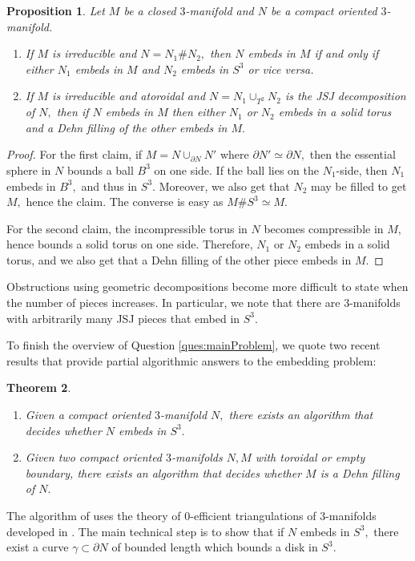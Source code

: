 \documentclass[12pt]{amsart}
\newtheorem{thm}{Theorem}[section]
\newtheorem{prop}[thm]{Proposition}
\theoremstyle{definition}
\begin{document}
\begin{prop}\label{prop:GeomDecObs} Let $M$ be a closed $3$-manifold and $N$ be a compact oriented $3$-manifold.
	\begin{enumerate}
		\item If $M$ is irreducible and $N=N_1\# N_2,$ then $N$ embeds in $M$ if and only if either $N_1$ embeds in $M$ and $N_2$ embeds in $S^3$ or vice versa.
		\item If $M$ is irreducible and atoroidal and $N=N_1\cup_{T^2} N_2$ is the JSJ decomposition of $N,$ then if $N$ embeds in $M$ then either $N_1$ or $N_2$ embeds in a solid torus and a Dehn filling of the other embeds in $M.$  
	\end{enumerate}
\end{prop}
\begin{proof}
	For the first claim, if $M=N\cup_{\partial N}N'$ where $\partial N'\simeq \partial N,$ then the essential sphere in $N$ bounds a ball $B^3$ on one side. If the ball lies on the $N_1$-side, then $N_1$ embeds in $B^3,$ and thus in $S^3.$ Moreover, we also get that $N_2$ may be filled to get $M,$ hence the claim. The converse is easy as $M\# S^3\simeq M.$
	
	For the second claim, the incompressible torus in $N$ becomes compressible in $M,$ hence bounds a solid torus on one side. Therefore, $N_1$ or $N_2$ embeds in a solid torus, and we also get that a Dehn filling of the other piece embeds in $M.$
\end{proof}

Obstructions using geometric decompositions become more difficult to state when the number of pieces increases. In particular, we note that there are $3$-manifolds with arbitrarily many JSJ pieces that embed in $S^3.$

To finish the overview of Question \ref{ques:mainProblem}, we quote two recent results that provide partial algorithmic answers to the embedding problem:

\begin{thm}
	\label{thm:algo}
	\begin{enumerate}
		\item \cite[Theorem 1.3]{MST18} Given a compact oriented $3$-manifold $N,$ there exists an algorithm that decides whether $N$ embeds in $S^3.$
		\item \cite{Sch25} Given two compact oriented $3$-manifolds $N,M$ with toroidal or empty boundary, there exists an algorithm that decides whether $M$ is a Dehn filling of $N.$
	\end{enumerate}
\end{thm}
The algorithm of \cite{MST18} uses the theory of $0$-efficient triangulations of $3$-manifolds developed in \cite{JR03}. The main technical step is to show that if $N$ embeds in $S^3,$ there exist a curve $\gamma \subset \partial N$ of bounded length which bounds a disk in $S^3.$
\end{document}

